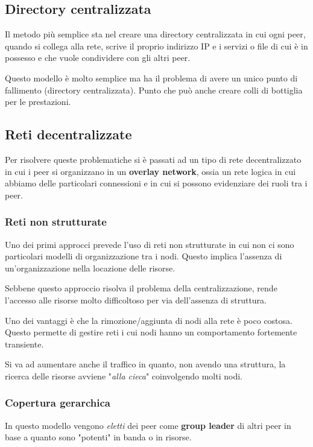 \subsection{Directory centralizzata}
Il metodo più semplice sta nel creare una directory centralizzata in
cui ogni peer, quando si collega alla rete, scrive il proprio indirizzo
IP e i servizi o file di cui è in possesso e che vuole condividere con
gli altri peer.

Questo modello è molto semplice ma ha il problema di avere un unico 
punto di fallimento (directory centralizzata). Punto che può anche 
creare colli di bottiglia per le prestazioni.

\subsection{Reti decentralizzate}
Per risolvere queste problematiche si è passati ad un tipo di rete
decentralizzato in cui i peer si organizzano in un \textbf{overlay 
network}, ossia un rete logica in cui abbiamo delle particolari 
connessioni e in cui si possono evidenziare dei ruoli tra i peer.

\subsubsection{Reti non strutturate}
Uno dei primi approcci prevede l'uso di reti non strutturate in cui
non ci sono particolari modelli di organizzazione tra i nodi. Questo
implica l'assenza di un'organizzazione nella locazione delle risorse.

Sebbene questo approccio risolva il problema della centralizzazione,
rende l'accesso alle risorse molto difficoltoso per via dell'assenza
di struttura. 

Uno dei vantaggi è che la rimozione/aggiunta di nodi alla rete è poco
costosa. Questo permette di gestire reti i cui nodi hanno un 
comportamento fortemente transiente.

Si va ad aumentare anche il traffico in quanto, non avendo una
struttura, la ricerca delle risorse avviene "\emph{alla cieca}"
coinvolgendo molti nodi.

\subsubsection{Copertura gerarchica}
In questo modello vengono \emph{eletti} dei peer come \textbf{group
leader} di altri peer in base a quanto sono "potenti" in banda o in
risorse.


